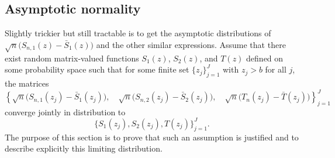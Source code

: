 \subsection{Asymptotic normality}

Slightly trickier but still tractable is to get the asymptotic distributions
of $\sqrt{n} \big( S_{n,1}(z) - \bar S_1 (z) \big)$ and the other similar expressions.
Assume that there exist random matrix-valued functions 
$S_1(z)$, $S_2(z)$, and $T(z)$ defined on some probability space
such that for some finite set $\{ z_j \}_{j=1}^J$ with $z_j > b$ for all $j$, 
the matrices
\begin{equation*}
    \left\{ 
        \sqrt{n} \big( S_{n,1}(z_j) - \bar S_1 (z_j) \big), \quad
        \sqrt{n} \big( S_{n,2}(z_j) - \bar S_2 (z_j) \big), \quad
        \sqrt{n} \big( T_n(z_j) - \bar T (z_j) \big) 
    \right\}_{j=1}^{J}
\end{equation*}
converge jointly in distribution to
\[
    \Big\{
        S_1(z_j), S_2(z_j), T(z_j)
    \Big\}_{j=1}^{J}.
\]
The purpose of this section is to prove that such an assumption is justified
and to describe explicitly this limiting distribution. 

